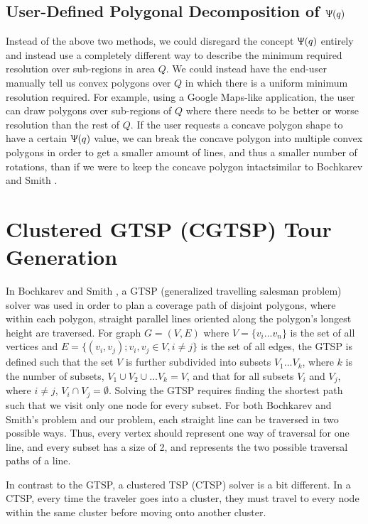 \documentclass[conference]{IEEEtran}
\theoremstyle{plain}%
\begin{document}
\subsection{User-Defined Polygonal Decomposition of $\Uppsi(q)$} 
Instead of the above two methods, we could disregard the concept $\Uppsi(q)$ entirely and instead use a completely different way to describe the minimum required resolution over sub-regions in area $Q$. We could instead have the end-user manually tell us convex polygons over $Q$ in which there is a uniform minimum resolution required. For example, using a Google Maps-like application, the user can draw polygons over sub-regions of $Q$ where there needs to be better or worse resolution than the rest of $Q$. If the user requests a concave polygon shape to have a certain $\Uppsi(q)$ value, we can break the concave polygon into multiple convex polygons in order to get a smaller amount of lines, and thus a smaller number of rotations, than if we were to keep the concave polygon intact\textemdash similar to Bochkarev and Smith \cite{bochkarevminimizing}.

\section{Clustered GTSP (CGTSP) Tour Generation}

In Bochkarev and Smith \cite{bochkarevminimizing}, a GTSP (generalized travelling salesman problem) solver was used in order to plan a coverage path of disjoint polygons, where within each polygon, straight parallel lines oriented along the polygon's longest height are traversed. For graph $G=(V,E)$ where $V=\{v_i...v_n\}$ is the set of all vertices and $E=\{(v_i,v_j) ; v_i, v_j \in V, i \neq j\}$ is the set of all edges, the GTSP is defined such that the set $V$ is further subdivided into subsets $V_1...V_k$, where $k$ is the number of subsets, $V_1\cup V_2 \cup ... V_k = V$, and that for all subsets $V_i$ and $V_j$, where $i \neq j$, $V_i \cap V_j = \emptyset$. Solving the GTSP requires finding the shortest path such that we visit only one node for every subset. For both Bochkarev and Smith's problem and our problem, each straight line can be traversed in two possible ways. Thus, every vertex should represent one way of traversal for one line, and every subset has a size of 2, and represents the two possible traversal paths of a line.

In contrast to the GTSP, a clustered TSP (CTSP) solver is a bit different. In a CTSP, every time the traveler goes into a cluster, they must travel to every node within the same cluster before moving onto another cluster. 
\end{document}
